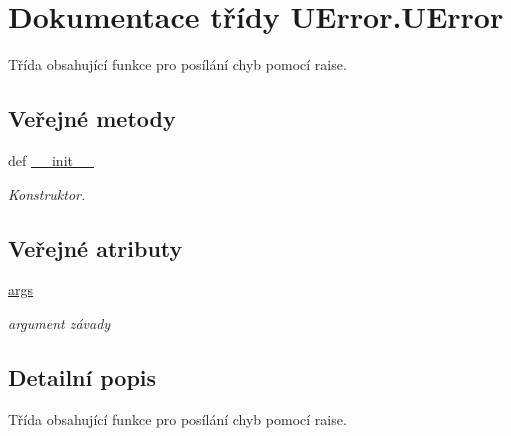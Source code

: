 \hypertarget{classUError_1_1UError}{\section{Dokumentace třídy U\-Error.\-U\-Error}
\label{d4/d16/classUError_1_1UError}
}


Třída obsahující funkce pro posílání chyb pomocí raise.  


\subsection*{Veřejné metody}
\begin{DoxyCompactItemize}
\item 
def \hyperlink{classUError_1_1UError_ac02a58051d2a8123f86c63479f082d5d}{\-\_\-\-\_\-init\-\_\-\-\_\-}
\begin{DoxyCompactList}\small\item\em Konstruktor. \end{DoxyCompactList}\end{DoxyCompactItemize}
\subsection*{Veřejné atributy}
\begin{DoxyCompactItemize}
\item 
\hypertarget{classUError_1_1UError_ab3f0d975e548c20542d7d8921c54ee18}{\hyperlink{classUError_1_1UError_ab3f0d975e548c20542d7d8921c54ee18}{args}}\label{d4/d16/classUError_1_1UError_ab3f0d975e548c20542d7d8921c54ee18}

\begin{DoxyCompactList}\small\item\em argument závady \end{DoxyCompactList}\end{DoxyCompactItemize}


\subsection{Detailní popis}
Třída obsahující funkce pro posílání chyb pomocí raise. 

